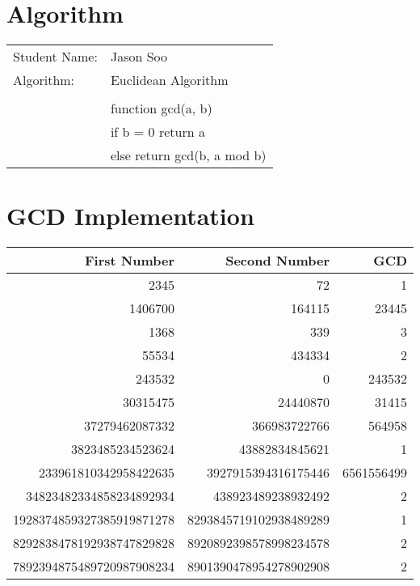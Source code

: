 \documentclass[11pt]{article}
\begin{document}
	\section{Algorithm} %
	\label{sec:algorithm}
	
	\begin{tabular}{ll}
		\hline
		Student Name: & Jason Soo\\
		Algorithm: & Euclidean Algorithm\\
		\\
		& function gcd(a, b)\\
		& if b = 0 return a\\
		& else return gcd(b, a mod b)\\
		\hline 
	\end{tabular}
	
	\section{GCD Implementation} %
	\label{sec:gcd_implementation}
	
	\begin{tabular}{rrr}
	\textbf{First Number} & \textbf{Second Number} & \textbf{GCD}\\
	\hline
	2345 & 72 & 1\\
	1406700 & 164115 & 23445\\
	1368 & 339 & 3\\
	55534 & 434334 & 2\\
	243532 & 0 & 243532\\
	30315475 & 24440870 & 31415\\
	37279462087332 & 366983722766 & 564958\\
	3823485234523624 & 43882834845621 & 1\\
	233961810342958422635 & 3927915394316175446 & 6561556499\\
	34823482334858234892934 & 438923489238932492 & 2\\
	1928374859327385919871278 & 8293845719102938489289 & 1\\
	8292838478192938747829828 & 8920892398578998234578 & 2\\
	7892394875489720987908234 & 8901390478954278902908 & 2\\
	\hline
	\end{tabular}
	
	
\end{document}
